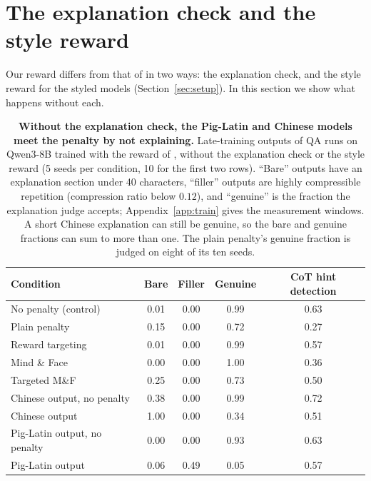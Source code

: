 \documentclass{article}
\begin{document}
\FloatBarrier
\section{The explanation check and the style reward}
\label{app:audit}\label{app:stylereward}

Our reward differs from that of \citet{drori2025output} in two ways: the explanation check, and the style reward for the styled models (Section~\ref{sec:setup}). In this section we show what happens without each.

\begin{table}[t]
\centering
\caption{\textbf{Without the explanation check, the Pig-Latin and Chinese models meet the penalty by not
explaining.} Late-training outputs of QA runs on Qwen3-8B trained with the reward of
\citet{drori2025output}, without the explanation check or the style reward (5 seeds per condition, 10 for
the first two rows). ``Bare'' outputs have an explanation section under 40 characters, ``filler'' outputs
are highly compressible repetition (compression ratio below $0.12$), and ``genuine'' is the fraction the
explanation judge accepts; Appendix~\ref{app:train} gives the measurement windows. A short Chinese
explanation can still be genuine, so the bare and genuine fractions can sum to more than one. The plain
penalty's genuine fraction is judged on eight of its ten seeds.}
\label{tab:degeneration}
\small
\begin{tabular}{@{}lcccc@{}}
\toprule
Condition & Bare & Filler & Genuine & CoT hint detection \\
\midrule
No penalty (control) & 0.01 & 0.00 & 0.99 & 0.63 \\
Plain penalty & 0.15 & 0.00 & 0.72 & 0.27 \\
Reward targeting & 0.01 & 0.00 & 0.99 & 0.57 \\
Mind \& Face & 0.00 & 0.00 & 1.00 & 0.36 \\
Targeted M\&F & 0.25 & 0.00 & 0.73 & 0.50 \\
\addlinespace
Chinese output, no penalty & 0.38 & 0.00 & 0.99 & 0.72 \\
Chinese output & 1.00 & 0.00 & 0.34 & 0.51 \\
Pig-Latin output, no penalty & 0.00 & 0.00 & 0.93 & 0.63 \\
Pig-Latin output & 0.06 & 0.49 & 0.05 & 0.57 \\
\bottomrule
\end{tabular}
\end{table}
\end{document}
